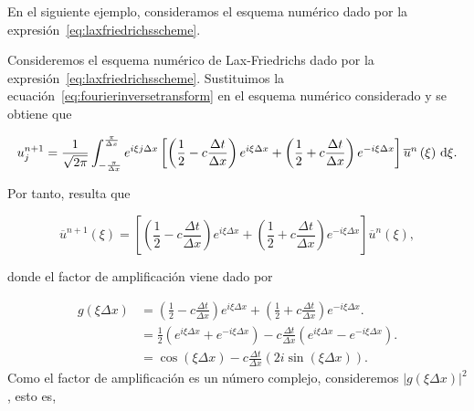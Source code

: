 En el siguiente ejemplo, consideramos el esquema numérico dado por la
expresión~\eqref{eq:laxfriedrichsscheme}.

\begin{example}
  Consideremos el esquema numérico de Lax-Friedrichs dado por la
  expresión~\eqref{eq:laxfriedrichsscheme}.
  Sustituimos la ecuación~\eqref{eq:fourierinversetransform} en el
  esquema numérico considerado y se obtiene que

  \begin{equation*}
    u^{n+1}_{j}=
    \frac{1}{\sqrt{2\pi}}
    \int_{-\frac{\pi}{\Delta x}}^{\frac{\pi}{\Delta x}}
    e^{i\xi j\Delta x}
    \left[
      \left(
      \frac{1}{2}-
      c\frac{\Delta t}{\Delta x}
      \right)
      e^{i\xi\Delta x}+
      \left(
      \frac{1}{2}+
      c\frac{\Delta t}{\Delta x}
      \right)
      e^{-i\xi\Delta x}
      \right]
    \overline{u}^{n}
    \left(\xi\right)
    \dl\xi.
  \end{equation*}

  Por tanto, resulta que

  \begin{equation*}
    \overline{u}^{n+1}
    \left(\xi\right)=
    \left[
      \left(
      \frac{1}{2}-
      c\frac{\Delta t}{\Delta x}
      \right)
      e^{i\xi\Delta x}+
      \left(
      \frac{1}{2}+
      c\frac{\Delta t}{\Delta x}
      \right)
      e^{-i\xi\Delta x}
      \right]
    \overline{u}^{n}
    \left(\xi\right),
  \end{equation*}

  donde el factor de amplificación viene dado por

  \begin{align*}
    g
    \left(
    \xi\Delta x
    \right) & =
    \left(
    \frac{1}{2}-
    c\frac{\Delta t}{\Delta x}
    \right)
    e^{i \xi \Delta x}+
    \left(
    \frac{1}{2}+c \frac{\Delta t}{\Delta x}
    \right)
    e^{-i\xi\Delta x}. \\
            & =
    \frac{1}{2}
    \left(
    e^{i\xi\Delta x}+
    e^{-i\xi\Delta x}
    \right)-
    c\frac{\Delta t}{\Delta x}
    \left(e^{i\xi\Delta x}-
    e^{-i\xi\Delta x}
    \right).           \\
            & =
    \cos\left(\xi\Delta x\right)-
    c\frac{\Delta t}{\Delta x}
    \left(
    2i\sin
    \left(\xi \Delta x\right)
    \right).
  \end{align*}
  Como el factor de amplificación es un número complejo, consideremos
  \begin{math}
    {\left|g\left(\xi\Delta x\right)\right|}^{2}
  \end{math},
  esto es,


\end{example}

